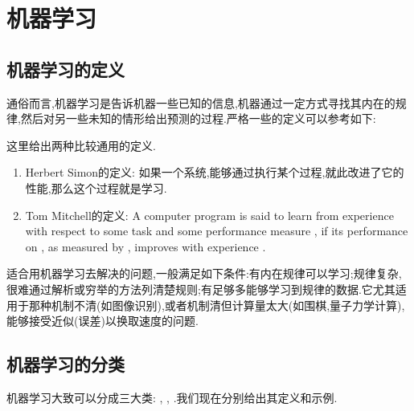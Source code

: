\documentclass{ctexart}
\begin{document}
\setcounter{FormalCounter}{0}
\section{机器学习}
\subsection{机器学习的定义}
通俗而言,机器学习是告诉机器一些已知的信息,机器通过一定方式寻找其内在的规律,然后对另一些未知的情形给出预测的过程.严格一些的定义可以参考如下:
\begin{definition}[机器学习的定义]
    这里给出两种比较通用的定义.
    \begin{enumerate}[label=\tbf{\arabic*.},topsep=0pt,parsep=0pt,itemsep=0pt,partopsep=0pt]
        \item Herbert Simon的定义: 如果一个系统,能够通过执行某个过程,就此改进了它的性能,那么这个过程就是学习.
        \item Tom Mitchell的定义: A computer program is said to learn from experience  with respect to some task  and some performance measure , if its performance on , as measured by , improves with experience .
    \end{enumerate}
\end{definition}
适合用机器学习去解决的问题,一般满足如下条件:有内在规律可以学习;规律复杂,很难通过解析或穷举的方法列清楚规则;有足够多能够学习到规律的数据.它尤其适用于那种机制不清(如图像识别),或者机制清但计算量太大(如围棋,量子力学计算),能够接受近似(误差)以换取速度的问题.
\subsection{机器学习的分类}
机器学习大致可以分成三大类: , , .我们现在分别给出其定义和示例.
\end{document}
